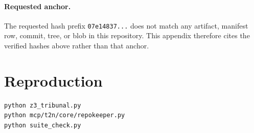 \documentclass[11pt]{article}
\newcommand{\code}[1]{\texttt{#1}}
\begin{document}
\paragraph{Requested anchor.} The requested hash prefix \code{07e14837...} does not match any artifact, manifest row, commit, tree, or blob in this repository. This appendix therefore cites the verified hashes above rather than that anchor.

\section{Reproduction}

\begin{verbatim}
python z3_tribunal.py
python mcp/t2n/core/repokeeper.py
python suite_check.py
\end{verbatim}
\end{document}
